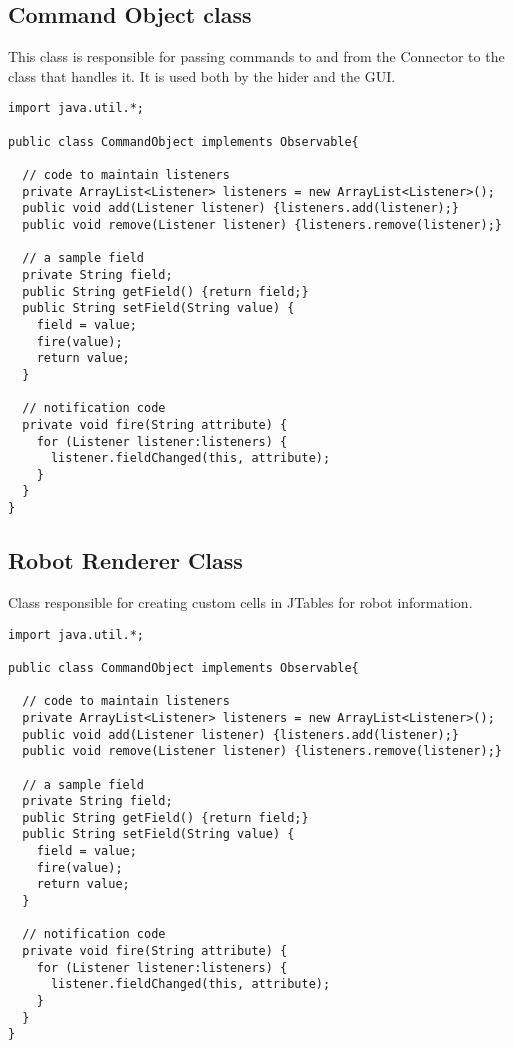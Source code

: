 \subsection{Command Object class}
This class is responsible for passing commands to and from the Connector to the class that handles it. It is used both by the hider and the GUI.
\begin{lstlisting}
import java.util.*;

public class CommandObject implements Observable{

  // code to maintain listeners
  private ArrayList<Listener> listeners = new ArrayList<Listener>();
  public void add(Listener listener) {listeners.add(listener);}
  public void remove(Listener listener) {listeners.remove(listener);}

  // a sample field
  private String field;
  public String getField() {return field;}
  public String setField(String value) {
    field = value;
    fire(value); 
    return value;   
  }

  // notification code
  private void fire(String attribute) {
    for (Listener listener:listeners) {
      listener.fieldChanged(this, attribute);
    }
  }
}
\end{lstlisting}
\subsection{Robot Renderer Class}
Class responsible for creating custom cells in JTables for robot information.
\begin{lstlisting}
import java.util.*;

public class CommandObject implements Observable{

  // code to maintain listeners
  private ArrayList<Listener> listeners = new ArrayList<Listener>();
  public void add(Listener listener) {listeners.add(listener);}
  public void remove(Listener listener) {listeners.remove(listener);}

  // a sample field
  private String field;
  public String getField() {return field;}
  public String setField(String value) {
    field = value;
    fire(value); 
    return value;   
  }

  // notification code
  private void fire(String attribute) {
    for (Listener listener:listeners) {
      listener.fieldChanged(this, attribute);
    }
  }
}
\end{lstlisting}

